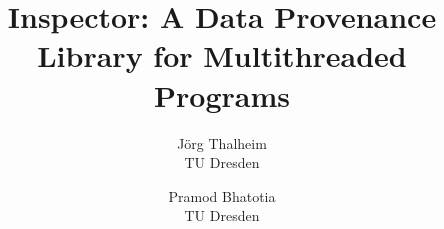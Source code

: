 \documentclass[letterpaper,twocolumn,10pt]{article}
\begin{document}
\title{Inspector: A Data Provenance Library for Multithreaded Programs}

\author{
\parbox{1.5in}{
\centerline{J\"{o}rg Thalheim}
\centerline{TU Dresden}
}
\and
\parbox{1.5in}{
\centerline{Pramod Bhatotia}
\centerline{TU Dresden}
}
}


\maketitle
\thispagestyle{empty}















 
\end{document}
